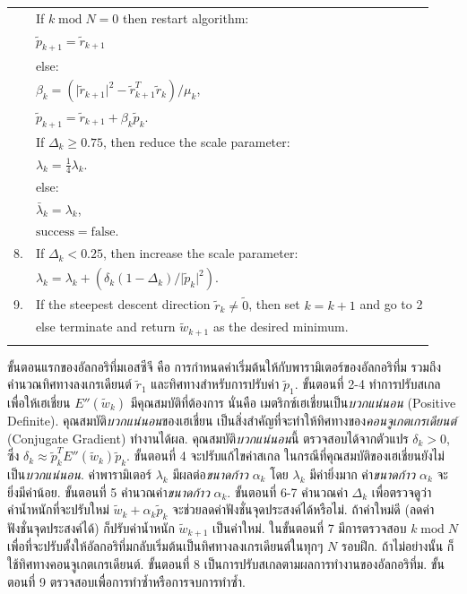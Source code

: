 \begin{table}[hbtp]
{\begin{center}
\begin{tabular}{|rl|}
& \;\; If $k \; \mathrm{mod} \; N = 0$ then restart algorithm: \\
& \;\; \;\; $\tilde{p}_{k+1} = \tilde{r}_{k+1}$ \\
& \;\; else: \\
& \;\; \;\; $\beta_k =(\vert \tilde{r}_{k+1} \vert^2 - \tilde{r}_{k+1}^T \tilde{r}_k)/\mu_k$, \\
& \;\; \;\; $\tilde{p}_{k+1} = \tilde{r}_{k+1} + \beta_k \tilde{p}_k$. \\
& \;\; If $\Delta_k \geq 0.75$, then reduce the scale parameter: \\
& \;\; \;\; $\lambda_k = \frac{1}{4} \lambda_k$. \\
& else: \\
& \;\; $\bar{\lambda}_k = \lambda_k$, \\
& \;\; $\mathrm{success} = \mathrm{false}$. \\
8. & If $\Delta_k < 0.25$, then increase the scale parameter: \\
& \;\; $\lambda_k = \lambda_k + (\delta_k (1 - \Delta_k)/ \vert \tilde{p}_k \vert^2 )$. \\
9. & If the steepest descent direction $\tilde{r}_k \neq \tilde{0}$,
then set $k = k+1$ and go to 2 \\
& else terminate and return $\tilde{w}_{k+1}$ as the desired minimum. \\
& \\
%
\hline
\end{tabular} 
\end{center}
}%
\end{table}

ขั้นตอนแรกของอัลกอริทึ่มเอสซีจี คือ การกำหนดค่าเริ่มต้นให้กับพารามิเตอร์ของอัลกอริทึ่ม 
รวมถึงคำนวณทิศทางลงเกรเดียนต์ $\tilde{r}_1$ และทิศทางสำหรับการปรับค่า $\tilde{p}_1$.
ขั้นตอนที่ 2-4 ทำการปรับสเกล เพื่อให้เฮเชี่ยน $E''(\tilde{w}_k)$ มีคุณสมบัติที่ต้องการ
นั่นคือ เมตริกซ์เฮเชี่ยนเป็น\textit{บวกแน่นอน} (Positive Definite).
คุณสมบัติ\textit{บวกแน่นอน}ของเฮเชี่ยน เป็นสิ่งสำคัญที่จะทำให้ทิศทางของ\textit{คอนจูเกตเกรเดียนต์} 
(Conjugate Gradient) ทำงานได้ผล.
คุณสมบัติ\textit{บวกแน่นอน}นี้ ตรวจสอบได้จากตัวแปร $\delta_k > 0$, 
ซึ่ง $\delta_k \approx \tilde{p}_k^T E''(\tilde{w}_k) \tilde{p}_k$.
ขั้นตอนที่ 4 จะปรับแก้ไขค่าสเกล ในกรณีที่คุณสมบัติของเฮเชี่ยนยังไม่เป็น\textit{บวกแน่นอน}.
ค่าพารามิเตอร์ $\lambda_k$ มีผลต่อ\textit{ขนาดก้าว} $\alpha_k$ 
โดย $\lambda_k$ มีค่ายิ่งมาก ค่า\textit{ขนาดก้าว} $\alpha_k$ จะยิ่งมีค่าน้อย.
ขั้นตอนที่ 5 คำนวณค่า\textit{ขนาดก้าว} $\alpha_k$.
ขั้นตอนที่ 6-7 คำนวณค่า $\Delta_k$ เพื่อตรวจดูว่า ค่าน้ำหนักที่จะปรับใหม่ $\tilde{w}_k + \alpha_k \tilde{p}_k$ จะช่วยลดค่าฟังชั่นจุดประสงค์ได้หรือไม่.
ถ้าค่าใหม่ดี (ลดค่าฟังชั่นจุดประสงค์ได้) ก็ปรับค่าน้ำหนัก $\tilde{w}_{k+1}$ เป็นค่าใหม่.
ในขั้นตอนที่ 7 มีการตรวจสอบ $k \; \mathrm{mod} \; N$ 
เพื่อที่จะปรับตั้งให้อัลกอริทึ่มกลับเริ่มต้นเป็นทิศทางลงเกรเดียนต์ในทุกๆ $N$ รอบฝึก.
ถ้าไม่อย่างนั้น ก็ใช้ทิศทางคอนจูเกตเกรเดียนต์.
ขั้นตอนที่ 8 เป็นการปรับสเกลตามผลการทำงานของอัลกอริทึ่ม.
ขั้นตอนที่ 9 ตรวจสอบเพื่อการทำซ้ำหรือการจบการทำซ้ำ.

